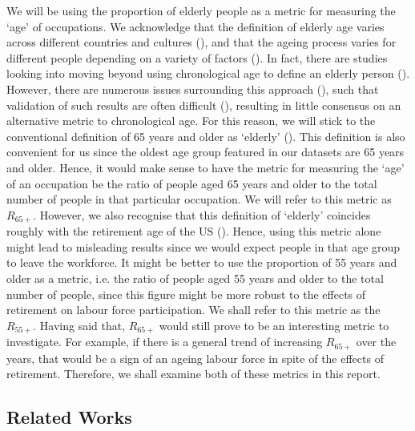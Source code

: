 \documentclass[11pt]{article}
\begin{document}
We will be using the proportion of elderly people as a metric for measuring the `age' of occupations. We acknowledge that the definition of elderly age varies across different countries and cultures (\cite{ageingculture}), and that the ageing process varies for different people depending on a variety of factors (\cite{levine2013modeling,hayflick2007biological}). In fact, there are studies looking into moving beyond using chronological age to define an elderly person (\cite{KotterGrhn2015,SOTOPEREZDECELIS2018e305,klemera2006new}). However, there are numerous issues surrounding this approach (\cite{jylhava2017biological}), such that validation of such results are often difficult (\cite{biologicalagedifficult}), resulting in little consensus on an alternative metric to chronological age. For this reason, we will stick to the conventional definition of 65 years and older as `elderly' (\cite{who2010definition,orimo2006reviewing,oecddata}). This definition is also convenient for us since the oldest age group featured in our datasets are 65 years and older. Hence, it would make sense to have the metric for measuring the `age' of an occupation be the ratio of people aged 65 years and older to the total number of people in that particular occupation. We will refer to this metric as $R_{65+}$. However, we also recognise that this definition of `elderly' coincides roughly with the retirement age of the US (\cite{MunnellAliciaH2013SSRR}). Hence, using this metric alone might lead to misleading results since we would expect people in that age group to leave the workforce. It might be better to use the proportion of 55 years and older as a metric, i.e. the ratio of people aged 55 years and older to the total number of people, since this figure might be more robust to the effects of retirement on labour force participation. We shall refer to this metric as the $R_{55+}$. Having said that, $R_{65+}$ would still prove to be an interesting metric to investigate. For example, if there is a general trend of increasing $R_{65+}$ over the years, that would be a sign of an ageing labour force in spite of the effects of retirement. Therefore, we shall examine both of these metrics in this report.

\subsection*{Related Works}
\end{document}
